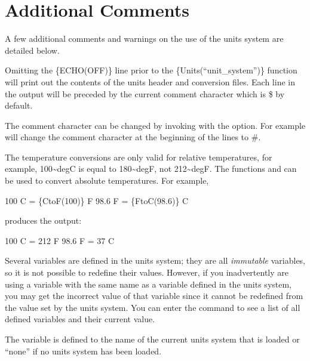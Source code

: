 \section{Additional Comments}

A few additional comments and warnings on the use of the units system are detailed
below.

Omitting the \{ECHO(OFF)\} line prior to the \{Units(``unit\_system'')\}
function will print out the contents of the units header and conversion files.
Each line in the output will be preceded by the current comment character which
is \$ by default.

The comment character can be changed by invoking \aprepro{} with the
 option. For example 
will change the comment character at the beginning of the lines to \#.

The temperature conversions are only valid for relative temperatures, for
example, 100\textasciitilde{}degC is equal to 180\textasciitilde{}degF, not 212\textasciitilde{}degF.
The functions  and  can be used to convert absolute temperatures.  For example,
\begin{apinp}
100 C = \{CtoF(100)\} F
98.6 F = \{FtoC(98.6)\} C
\end{apinp}
produces the output:
\begin{apout}
100 C = 212 F
98.6 F = 37 C
\end{apout}

Several variables are defined in the units system; they are all
\textit{immutable} variables, so it is not possible to
redefine their values.  However, if you inadvertently are using a
variable with the same name as a variable defined in the units system,
you may get the incorrect value of that variable since it cannot be
redefined from the value set by the units system. You can enter the
command  to see a list of all defined variables and their
current value.

The \aprepro{} variable  is defined to the name
of the current units system that is loaded or ``none'' if no units
system has been loaded.
